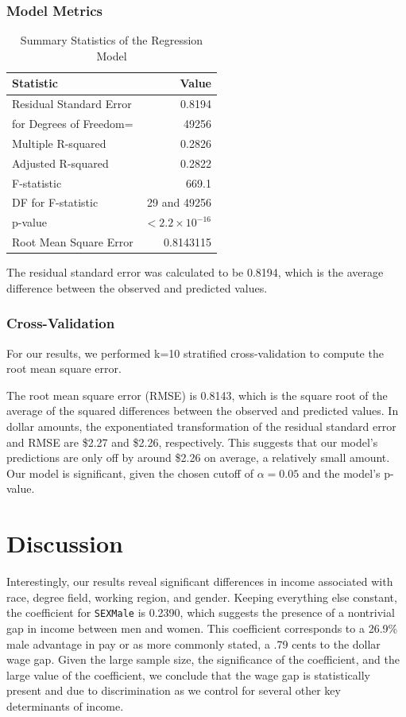 \documentclass{article}
\begin{document}
\subsubsection*{Model Metrics}
\begin{table}[h]
    \centering
    \begin{tabular}{lr}
    \toprule
    \textbf{Statistic} & \textbf{Value} \\
    \midrule
    Residual Standard Error & 0.8194 \\
    for Degrees of Freedom= & 49256 \\
    \midrule
    Multiple R-squared & 0.2826 \\
    Adjusted R-squared & 0.2822 \\
    F-statistic & 669.1 \\
    DF for F-statistic & 29 and 49256 \\
    p-value & $< 2.2 \times 10^{-16}$ \\
    Root Mean Square Error & 0.8143115 \\
    \bottomrule
    \end{tabular}
    \caption*{Summary Statistics of the Regression Model}
\end{table}

The residual standard error was calculated to be 0.8194, which is the average difference between the observed and predicted values.

\subsubsection*{Cross-Validation}
For our results, we performed k=10 stratified cross-validation to compute the root mean square error.

The root mean square error (RMSE) is 0.8143, which is the square root of the average of the squared differences between the observed and predicted values. In dollar amounts, the exponentiated transformation
of the residual standard error and RMSE are \$2.27 and \$2.26, respectively. This suggests that our model's predictions are only off by around \$2.26 on average,
a relatively small amount. Our model is significant, given the chosen cutoff of $\alpha=0.05$ and the model's p-value.

\section*{Discussion}
Interestingly, our results reveal significant differences in income associated with race, degree field, working region, and gender.
Keeping everything else constant, the coefficient for \texttt{SEXMale} is 0.2390, which suggests the presence of a nontrivial gap in income between men and women.
This coefficient corresponds to a 26.9\% male advantage in pay or as more commonly stated, a .79 cents to the dollar wage gap.
Given the large sample size, the significance of the coefficient, and the large value of the coefficient, we conclude that the wage gap is statistically present
and due to discrimination as we control for several other key determinants of income.
\end{document}
